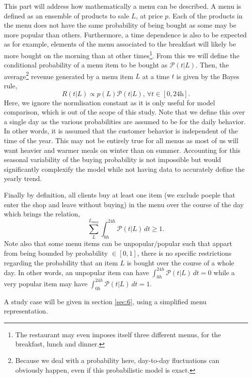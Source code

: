 \documentclass{article}
\begin{document}
This part will address how mathematically a menu can be described. A menu is defined as an ensemble of products to sale $L$, at price ${p}$. Each of the products in the menu does not have the same probability of being bought as some may be more popular than others. Furthermore, a time dependence is also to be expected as for example, elements of the menu associated to the breakfast will likely be more bought on the morning than at other times\footnote{The restaurant may even imposes itself three different menus, for the breakfast, lunch and dinner.}. From this we will define the conditional probability of a menu item to be bought as $\mathcal{P}(t|L)$.
Then, the average\footnote{Because we deal with a probability here, day-to-day fluctuations can obviously happen, even if this probabilistic model is exact.} revenue generated by a menu item $L$ at a time $t$ is given by the Bayes rule,
\begin{equation}
    R(t | L) \propto p(L) \mathcal{P}(t|L), \, \forall t \in \mathrm{[0,24h]}.
\end{equation}
Here, we ignore the normlisation constant as it is only useful for model comparison, which is out of the scope of this study.
Note that we define this over a single day as the various probabilities are assumed to be for the daily behavior. In other words, it is assumed that the customer behavior is independent of the time of the year. This may not be entirely true for all menus as most of us will want heavier and warmer meals on winter than on summer. Accounting for this seasonal variability of the buying probability is not impossible but would significantly complexify the model while not having data to accurately define the yearly trend. 

Finally by definition, all clients buy at least one item (we exclude poeple that enter the shop and leave without buying) in the menu over the course of the day which brings the relation,
\begin{equation}
    \sum^{L_{max}}_L \int^{24h}_{0h}\mathcal{P}(t|L) \, dt \ge 1.
\end{equation}
Note also that some menu items can be unpopular/popular such that appart from being bounded by probability $\in[0,1]$, there is no specific restrictions regarding the probability that an item $L$ is bought over the course of a whole day. In other words, an unpopular item can have $\int^{24h}_{0h}\mathcal{P}(t|L) \, dt = 0$ while a very popular item may have $\int^{24h}_{0h}\mathcal{P}(t|L) \, dt= 1$.

A study case will be given in section \ref{sec:6}, using a simplified menu representation.
\end{document}
